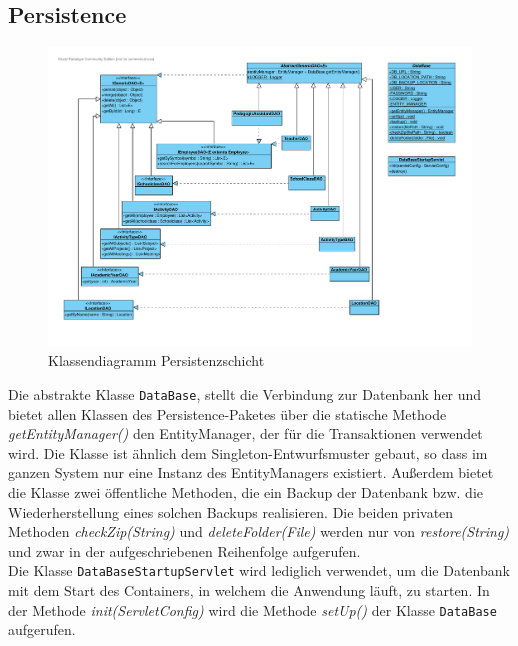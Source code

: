 \documentclass[fontsize=12pt,paper=a4,twoside]{scrartcl}
\begin{document}
\subsection{Persistence}

\begin{figure}[H]
\includegraphics[width=\textwidth]{persistence.pdf}
\caption{Klassendiagramm Persistenzschicht}
\end{figure}

Die abstrakte Klasse \texttt{DataBase}, stellt die Verbindung zur Datenbank her und bietet allen Klassen des Persistence-Paketes über die statische Methode \textit{getEntityManager()} den EntityManager, der für die Transaktionen verwendet wird. Die Klasse ist ähnlich dem Singleton-Entwurfsmuster gebaut, so dass im ganzen System nur eine Instanz des EntityManagers existiert. Außerdem bietet die Klasse zwei öffentliche Methoden, die ein Backup der Datenbank bzw. die Wiederherstellung eines solchen Backups realisieren. Die beiden privaten Methoden \textit{checkZip(String)} und \textit{deleteFolder(File)} werden nur von \textit{restore(String)} und zwar in der aufgeschriebenen Reihenfolge aufgerufen.\\

Die Klasse \texttt{DataBaseStartupServlet} wird lediglich verwendet, um die Datenbank mit dem Start des Containers, in welchem die Anwendung läuft, zu starten. In der Methode \textit{init(ServletConfig)} wird die Methode \textit{setUp()} der Klasse \texttt{DataBase} aufgerufen.\\
\end{document}
